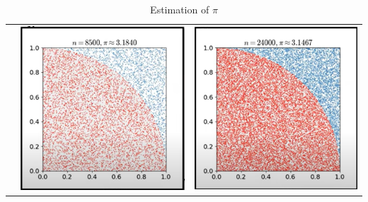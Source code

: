 \documentclass[12pt]{article}
\begin{document}
\begin{enumerate}
\begin{table}[h]
\begin{tabular}{ccc}
        &         
        \includegraphics[scale=0.25]{figures/pi1.png} 
        &         
        \includegraphics[scale=0.25]{figures/pi3.png}\\
        \end{tabular}
        \caption{Estimation of $\pi$}
    \end{table}
    \end{enumerate}
\end{document}
